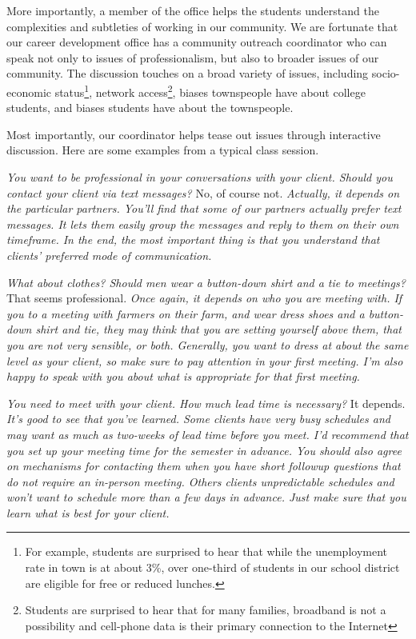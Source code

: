 More importantly, a member of the office helps the students understand
the complexities and subtleties of working in our community.  We
are fortunate that our career development office has a community
outreach coordinator who can speak not only to issues of professionalism,
but also to broader issues of our community.  The discussion touches
on a broad variety of issues, including socio-economic status\footnote{For
example, students are surprised to hear that while the unemployment
rate in town is at about 3\%, over one-third of students in our
school district are eligible for free or reduced lunches.}, network
access\footnote{Students are surprised to hear that for many families,
broadband is not a possibility and cell-phone data is their primary
connection to the Internet}, biases townspeople have about college
students, and biases students have about the townspeople.

Most importantly, our coordinator helps tease out issues through interactive
discussion.  Here are some examples from a typical class session.


\newcommand{\question}[1]{\textsl{#1}}
\newcommand{\answer}[1]{#1}
\newcommand{\followup}[1]{\textsl{#1}}

\question{You want to be professional in your conversations with your client.  Should you contact your client via text messages?}
\answer{No, of course not.}
\followup{Actually, it depends on the particular partners.  You'll find that some of our partners actually prefer text messages.  It lets them easily group the messages and reply to them on their own timeframe.  In the end, the most important thing is that you understand that clients' preferred mode of communication.}

\question{What about clothes?  Should men wear a button-down shirt and a tie to meetings?}
\answer{That seems professional.}
\followup{Once again, it depends on who you are meeting with.  If
you to a meeting with farmers on their farm, and wear dress shoes
and a button-down shirt and tie, they may think that you are setting
yourself above them, that you are not very sensible, or both.
Generally, you want to dress at about the same level as your client,
so make sure to pay attention in your first meeting.  I'm also happy
to speak with you about what is appropriate for that first meeting.}

\question{You need to meet with your client.  How much lead time is necessary?}
\answer{It depends.}
\followup{It's good to see that you've learned.  Some clients have very
busy schedules and may want as much as two-weeks of lead time before
you meet.  I'd recommend that you set up your meeting time for the
semester in advance.  You should also agree on mechanisms for
contacting them when you have short followup questions that do not
require an in-person meeting.  Others clients unpredictable schedules
and won't want to schedule more than a few days in advance.  Just make
sure that you learn what is best for your client.}

